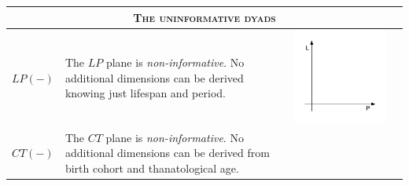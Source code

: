 \documentclass[11pt,oneside,a4paper]{article} %
\begin{document}
\begin{center}
\begin{longtable}{m{}m{}m{}m{}}
  \midrule
  \multicolumn{4}{c}{\textsc{The uninformative dyads}} \\
  \midrule
  $LP(-)$ &
  The $LP$ plane is \emph{non-informative}. No additional dimensions can be derived knowing just lifespan and period. &
  \includegraphics[width = \linewidth]{Figures/JonasTable/LP.pdf} & \\
  \midrule
  $CT(-)$ &
  The $CT$ plane is \emph{non-informative}. No additional dimensions can be
  derived from birth cohort and thanatological age. & \includegraphics[width =

\end{longtable}
\end{center}
\end{document}

